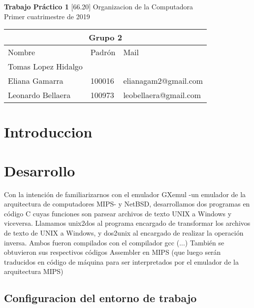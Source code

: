 \documentclass[titlepage,a4paper]{article}
\begin{document}
\begin{titlepage} %
    \centering
    \vfill
    \Huge \textbf{Trabajo Práctico 1}
    \vskip2cm
    \Large [66.20] Organizacion de la Computadora\\
    Primer cuatrimestre de 2019 
    \vskip2cm
    \begin{table}[htbp]
	\begin{center}
	\begin{tabular}{|l|l|l|}
	\hline
    \multicolumn{3}{|c|}{Grupo 2} \\ \hline
	Nombre & Padrón & Mail \\ \hline 
    Tomas Lopez Hidalgo & & \\ \hline 
    Eliana Gamarra & 100016 & elianagam2@gmail.com\\ \hline
    Leonardo Bellaera &  100973 & leobellaera@gmail.com \\ \hline
    \end{tabular}
	\label{tabla:sencilla}
	\end{center}
	\end{table}

    \vfill
\end{titlepage}
\tableofcontents %
\newpage

\section{Introduccion}\label{sec:intro}


\section{Desarrollo}\label{sec:intro}
Con la intención de familiarizarnos con el emulador GXemul -un emulador de la arquitectura de computadores MIPS- y NetBSD, desarrollamos dos programas en código C cuyas funciones son parsear archivos de texto UNIX a Windows y viceversa. Llamamos unix2dos al programa encargado de transformar los archivos de texto de UNIX a Windows, y dos2unix al encargado de realizar la operación inversa.
Ambos fueron compilados con el compilador gcc (...) %
También se obtuvieron sus respectivos códigos Assembler en MIPS (que luego serán traducidos en código de máquina para ser interpretados por el emulador de la arquitectura MIPS)

\subsection{Configuracion del entorno de trabajo}
\end{document}
